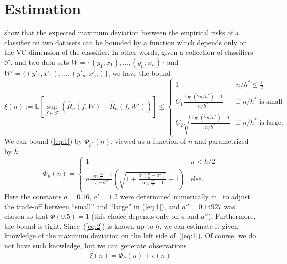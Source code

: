 \documentclass[11pt]{article}
\newcommand{\F}{\mathcal{F}}
\newcommand{\E}{\mathbb{E}}
\renewcommand{\eqref}[1]{(\ref{eq:#1})}
\begin{document}
\section{Estimation}
\label{sec:estimation}

\citet{VapnikLevin1994} show that the expected maximum deviation between the
empirical risks of a classifier on two datasets can be bounded by a function
which depends only on the VC dimension of the classifier. In other words, given
a collection of classifiers $\F$, and two data sets
$W=\{(y_1,x_1),\ldots,(y_n,x_n)\}$ and $W' =
\{(y'_1,x'_1),\ldots,(y'_n,x'_n)\}$, we have the bound
\begin{equation}
  \label{eq:1}
    \xi(n) :=\E\left[ \sup_{f\in\F} (\widehat{R}_n(f,W) -
      \widehat{R}_n(f,W')) \right]\leq \begin{cases} 1 & n/h^* \leq
      \frac{1}{2}\\ C_1 \frac{ \log(2n/h^*) + 1}{n/h^*} & \mbox{if
        $n/h^*$ is small}\\ C_2\sqrt{ \frac{ \log(2n/h^*) + 1}{n/h^*}} &
      \mbox{if $n/h^*$ is large}. \end{cases}
\end{equation}
We can bound \eqref{1} by $\Phi_{h^*}(n)$, viewed as a function of $n$ and
parametrized by $h$:
\begin{equation}
  \label{eq:2}
  \Phi_h(n) = \begin{cases} 1 & n < h/2\\ a\frac{\log\frac{2n}{h}+1}{\frac{n}{h} -
      a''} \left( \sqrt{ 1+
        \frac{a'\left(\frac{n}{h}-a''\right)}{\log\frac{2n}{h}+1}} +
      1\right) & \mbox{else}. \end{cases}
  \end{equation}
Here the constants $a=0.16$, $a'=1.2$ were determined numerically
in~\citep{VapnikLevin1994} to adjust the trade-off between ``small'' and
``large'' in \eqref{1}, and $a''=0.14927$ was chosen so that $\Phi(0.5)=1$
(this choice depends only on $a$ and $a''$).  Furthermore, the bound is tight.
Since~\eqref{2} is known up to $h$, we can estimate it given knowledge of the
maximum deviation on the left side of~\eqref{1}. Of course, we do not have such
knowledge, but we can generate observations
\begin{equation*}
  \label{eq:3}
  \widehat{\xi}(n) = \Phi_h(n) + \epsilon(n)
\end{equation*}
\end{document}
